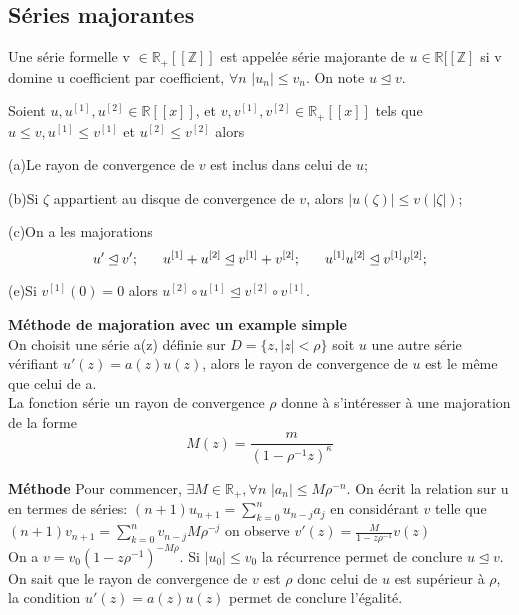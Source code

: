\documentclass[a4paper,10.5pt]{article}
\begin{document}
	\subsection{Séries majorantes}
	
	\begin{definition} Une série formelle v $\in \mathbb{R}_{+}[[\mathbb{Z}]]$ est appelée série majorante de $ u \in \mathbb{R}[[\mathbb{Z}]$ si v domine u coefficient par coefficient, $\forall n$ $ |u_{n}|\leq v_{n}$. On note $u \unlhd v$.
	\end{definition}
	
	\begin{proposition} Soient $u,u^{[1]},u^{[2]}\in \mathbb{R}[[x]]$, et $v,v^{[1]},v^{[2]} \in \mathbb{R}_{+}[[x]]$ tels que $u\leq v,u^{[1]}\leq v^{[1]}$ et $u^{[2]}\leq v^{[2]}$ alors
		
		(a)Le rayon de convergence de $v$ est inclus dans celui de $u$;
		
		(b)Si $\zeta$ appartient au disque de convergence de $v$, alors $|u(\zeta)|\leq v(|\zeta|)$;
		
		(c)On a les majorations
		\[u' \unlhd v'; \hspace{6mm} u^{[1]}+u^{[2]}\unlhd v^{[1]}+v^{[2]}; \hspace{6mm}u^{[1]}u^{[2]}\unlhd v^{[1]}v^{[2]}; \]
		
		(e)Si $v^{[1]}(0)=0$ alors $ u^{[2]} \circ u^{[1]} \unlhd v^{[2]}\circ v^{[1]}$.
		
	\end{proposition}
	
	\noindent\textbf{Méthode de majoration avec un example simple}\\
	On choisit une série a(z) définie sur $D=\{z,|z|<\rho\}$ soit $u$ une autre série vérifiant $u'(z)=a(z)u(z)$, alors le rayon de convergence de $u$ est le même que celui de a.\\
	La fonction série un rayon de convergence $\rho$ donne à s'intéresser à une majoration de la forme
	\[M(z)=\frac{m}{(1-\rho^{-1} z)^{\kappa}}\] 
	
	\noindent\textbf{Méthode} Pour commencer, $\exists M \in \mathbb{R}_{+}, \forall n$ $|a_{n}|\leq M \rho^{-n}$.
	On écrit la relation sur u en termes de séries: $(n+1)u_{n+1}=\sum_{k=0}^{n}u_{n-j}a_{j}$ en considérant $v$ telle que  $(n+1)v_{n+1}=\sum_{k=0}^{n}v_{n-j}M\rho^{-j}$ on observe $v'(z)=\frac{M}{1-z\rho^{-1}}v(z)$ \\
	On a $v=v_{0}(1-z\rho^{-1})^{-M\rho}$. Si $|u_{0}| \leq v_{0}$ la récurrence permet de conclure $ u\unlhd v$. On sait que le rayon de convergence de $v$ est $\rho$ donc celui de $u$ est supérieur à $\rho$, la condition $u'(z)=a(z)u(z)$ permet de conclure l'égalité.
	
\end{document}
